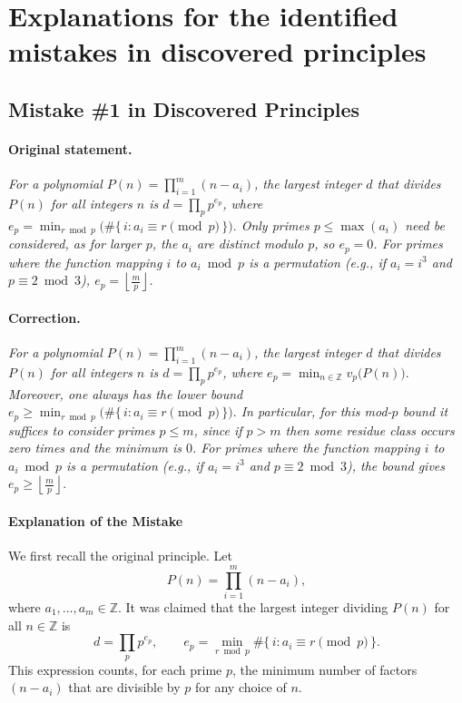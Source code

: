 \documentclass{article}
\theoremstyle{plain}
\theoremstyle{definition}
\theoremstyle{remark}
\begin{document}
\clearpage
\newpage


\section{Explanations for the identified mistakes in discovered principles}

\subsection{Mistake \#1 in Discovered Principles}
\label{app:mistake-made-by-principle}

\paragraph{Original statement.}
\emph{For a polynomial $P(n) = {\textstyle\prod}_{i=1}^m (n - a_i)$, the largest integer $d$ that divides $P(n)$ for all integers $n$ is $d = {\textstyle\prod}_{p} p^{e_p}$, where
$e_p = \min_{r \bmod p} \bigl(\#\{\, i : a_i \equiv r \!\!\pmod p \,\}\bigr).$
Only primes $p \le \max(a_i)$ need be considered, as for larger $p$, the $a_i$ are distinct modulo $p$, so $e_p = 0$.
For primes where the function mapping $i$ to $a_i \bmod p$ is a permutation (e.g., if $a_i = i^3$ and $p \equiv 2 \bmod 3$), $e_p = {\textstyle{\left\lfloor \frac{m}{p} \right\rfloor}}$.
}

\paragraph{Correction.}
\emph{For a polynomial $P(n) = \prod_{i=1}^m (n - a_i)$, the largest integer $d$ that divides $P(n)$ for all integers $n$ is $d = \prod_{p} p^{e_p}$, where $e_p = \min_{n \in \mathbb{Z}} v_p\!\bigl(P(n)\bigr).$ Moreover, one always has the lower bound $e_p \ge \min_{r \bmod p} \bigl(\#\{\, i : a_i \equiv r \!\!\pmod p \,\}\bigr).$ In particular, for this mod-$p$ bound it suffices to consider primes $p \le m$, since if $p>m$ then some residue class occurs zero times and the minimum is $0$. For primes where the function mapping $i$ to $a_i \bmod p$ is a permutation (e.g., if $a_i = i^3$ and $p \equiv 2 \bmod 3$), the bound gives $e_p \boldsymbol{\ge} \left\lfloor \frac{m}{p} \right\rfloor.$
}

\paragraph{Explanation of the Mistake}

We first recall the original principle.
Let
\[
P(n)=\prod_{i=1}^m (n-a_i),
\]
where $a_1,\dots,a_m\in\mathbb Z$.
It was claimed that the largest integer dividing $P(n)$ for all $n\in\mathbb Z$ is
\[
d=\prod_p p^{e_p},
\qquad
e_p=\min_{r \bmod p}\#\{\,i : a_i \equiv r \pmod p\,\}.
\]
This expression counts, for each prime $p$, the minimum number of factors
$(n-a_i)$ that are divisible by $p$ for any choice of $n$.
\end{document}
